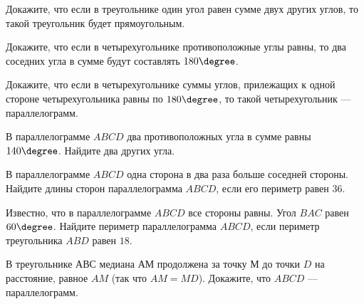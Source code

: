 \begin{class}[number=6]
	\begin{listofex}
		\item Докажите, что если в треугольнике один угол равен сумме двух других углов, то такой треугольник будет прямоугольным.
		\item Докажите, что если в четырехугольнике противоположные углы равны, то два соседних угла в сумме будут составлять \( 180\degree \).
		\item Докажите, что если в четырехугольнике суммы углов, прилежащих к одной стороне четырехугольника равны по \( 180\degree \), то такой четырехугольник --- параллелограмм.
		\item В параллелограмме \( ABCD \) два противоположных угла в сумме равны \( 140\degree \). Найдите два других угла.
		\item В параллелограмме \( ABCD \) одна сторона в два раза больше соседней стороны. Найдите длины сторон параллелограмма \( ABCD \), если его периметр равен \( 36 \).
		\item Известно, что в параллелограмме \( ABCD \) все стороны равны. Угол \( BAC \) равен \( 60\degree \). Найдите периметр параллелограмма \( ABCD \), если периметр треугольника \( ABD \) равен \( 18 \).
		\item В треугольнике \( АВС \) медиана \( АМ \) продолжена за точку \( М \) до точки \( D \) на расстояние, равное \( AM \) (так что \( AM=MD\)). Докажите, что \( ABCD \) --- параллелограмм.
	\end{listofex}
\end{class}
%
%
%	
%
%
%	
%
%
%	
